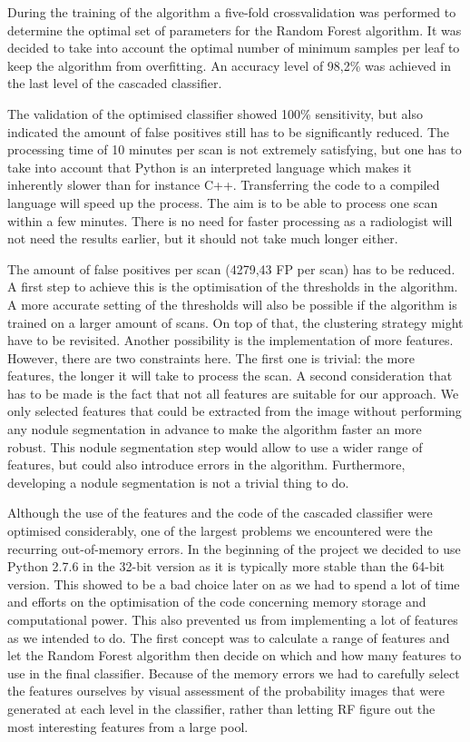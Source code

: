 During the training of the algorithm a five-fold crossvalidation was performed
to determine the optimal set of parameters for the Random Forest algorithm. It
was decided to take into account the optimal number of minimum samples per leaf
to keep the algorithm from overfitting. An accuracy level of 98,2\% was achieved
in the last level of the cascaded classifier.

The validation of the optimised classifier showed 100\% sensitivity, but also
indicated the amount of false positives still has to be significantly reduced.
The processing time of 10 minutes per scan is not extremely satisfying, but one
has to take into account that Python is an interpreted language which makes it
inherently slower than for instance C++. Transferring the code to a compiled
language will speed up the process. The aim is to be able to process one scan
within a few minutes. There is no need for faster processing as a radiologist
will not need the results earlier, but it should not take much longer either.

The amount of false positives per scan (4279,43 FP per scan) has to be reduced.
A first step to achieve this is the optimisation of the thresholds in the
algorithm. A more accurate setting of the thresholds will also be possible if the
algorithm is trained on a larger amount of scans. On top of that, the clustering
strategy might have to be revisited. Another possibility is the implementation
of more features. However, there are two constraints here. The first
one is trivial: the more features, the longer it will take to process the scan.
A second consideration that has to be made is the fact that not all features are
suitable for our approach. We only selected features that could be extracted
from the image without performing any nodule segmentation in advance to make the
algorithm faster an more robust. This nodule segmentation step would allow to
use a wider range of features, but could also introduce errors in the algorithm.
Furthermore, developing a nodule segmentation is not a trivial thing to do.

Although the use of the features and the code of the cascaded classifier were
optimised considerably, one of the largest problems we encountered were the
recurring out-of-memory errors. In the beginning of the project we decided to
use Python 2.7.6 in the 32-bit version as it is typically more stable than the
64-bit version. This showed to be a bad choice later on as we had to spend a lot
of time and efforts on the optimisation of the code concerning memory storage
and computational power. This also prevented us from implementing a lot of
features as we intended to do. The first concept was to calculate a range of
features and let the Random Forest algorithm then decide on which and how many
features to use in the final classifier. Because of the memory errors we had to
carefully select the features ourselves by visual assessment of the probability
images that were generated at each level in the classifier, rather than letting
RF figure out the most interesting features from a large pool.

